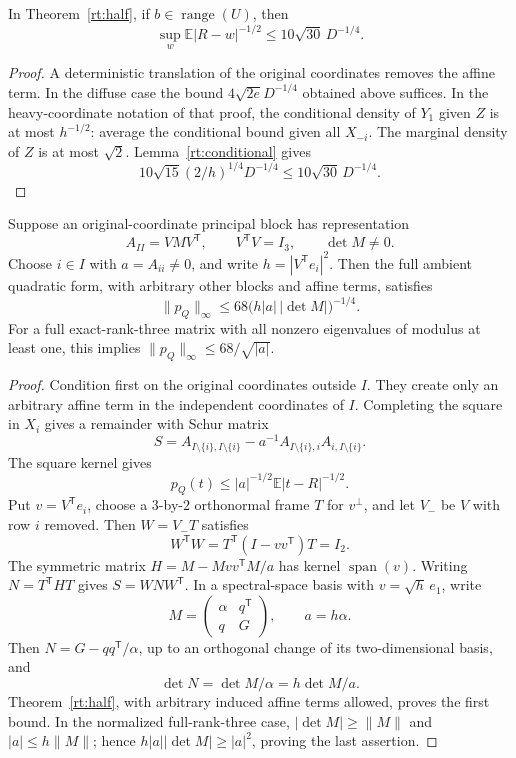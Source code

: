 \begin{corollary}
\label{rt:range}
In Theorem~\ref{rt:half}, if \(b\in\operatorname{range}(U)\),
then
\[
 \sup_w\mathbb E|R-w|^{-1/2}
 \leq10\sqrt{30}\,D^{-1/4}.
\]
\end{corollary}
\begin{proof}
A deterministic translation of the original coordinates
removes the affine term.  In the diffuse case the
bound \(4\sqrt{2e}D^{-1/4}\) obtained above suffices.
In the heavy-coordinate notation of that proof,
the conditional density of \(Y_1\) given \(Z\) is at
most \(h^{-1/2}\): average the conditional bound given
all \(X_{-i}\).  The marginal density of \(Z\) is at
most \(\sqrt2\).
Lemma~\ref{rt:conditional} gives
\[
 10\sqrt{15}(2/h)^{1/4}D^{-1/4}
 \leq10\sqrt{30}\,D^{-1/4}.
\]
\end{proof}

\begin{theorem}
\label{rt:rank-three-schur}
Suppose an original-coordinate principal block has
representation
\[
 A_{II}=VMV^{\mathsf T},\qquad
 V^{\mathsf T}V=I_3,\qquad \det M\ne0.
\]
Choose \(i\in I\) with \(a=A_{ii}\ne0\), and write
\(h=|V^{\mathsf T}e_i|^2\).
Then the full ambient quadratic form, with arbitrary
other blocks and affine terms, satisfies
\[
 \|p_Q\|_\infty
 \leq68\bigl(h|a|\,|\det M|\bigr)^{-1/4}.
\]
For a full exact-rank-three matrix with all nonzero
eigenvalues of modulus at least one, this implies
\(\|p_Q\|_\infty\leq68/\sqrt{|a|}\).
\end{theorem}
\begin{proof}
Condition first on the original coordinates outside
\(I\).  They create only an arbitrary affine term in
the independent coordinates of \(I\).
Completing the square in \(X_i\) gives a remainder
with Schur matrix
\[
 S=A_{I\setminus\{i\},I\setminus\{i\}}
 -a^{-1}A_{I\setminus\{i\},i}A_{i,I\setminus\{i\}}.
\]
The square kernel gives
\[
 p_Q(t)\leq |a|^{-1/2}\mathbb E|t-R|^{-1/2}.
\]
Put \(v=V^{\mathsf T}e_i\), choose a \(3\)-by-\(2\)
orthonormal frame \(T\) for \(v^\perp\), and let
\(V_-\) be \(V\) with row \(i\) removed.
Then \(W=V_-T\) satisfies
\[
 W^{\mathsf T}W=T^{\mathsf T}(I-vv^{\mathsf T})T=I_2.
\]
The symmetric matrix
\(H=M-Mvv^{\mathsf T}M/a\) has kernel
\(\operatorname{span}(v)\).  Writing
\(N=T^{\mathsf T}HT\) gives \(S=WNW^{\mathsf T}\).
In a spectral-space basis with \(v=\sqrt h\,e_1\),
write
\[
 M=\begin{pmatrix}\alpha&q^{\mathsf T}\\q&G\end{pmatrix},
 \qquad a=h\alpha.
\]
Then \(N=G-qq^{\mathsf T}/\alpha\), up to an
orthogonal change of its two-dimensional basis, and
\[
 \det N=\det M/\alpha=h\det M/a.
\]
Theorem~\ref{rt:half}, with arbitrary induced affine
terms allowed, proves the first bound.
In the normalized full-rank-three case,
\(|\det M|\geq\|M\|\) and \(|a|\leq h\|M\|\);
hence \(h|a||\det M|\geq |a|^2\), proving the last
assertion.
\end{proof}
